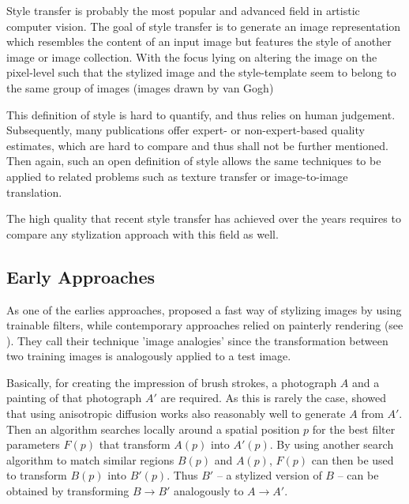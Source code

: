 Style transfer is probably the most popular and advanced field in artistic computer vision.
The goal of style transfer is to generate an image representation which resembles the content of an input image but features the style of another image or image collection.
With the focus lying on altering the image on the pixel-level such that the stylized image and the style-template seem to belong to the same group of images (\eg images drawn by van Gogh)

This definition of style is hard to quantify, and thus relies on human judgement.
Subsequently, many publications offer expert- or non-expert-based quality estimates, which are hard to compare and thus shall not be further mentioned.
Then again, such an open definition of style allows the same techniques to be applied to related problems such as texture transfer or image-to-image translation.

The high quality that recent style transfer has achieved over the years requires to compare any stylization approach with this field as well.

\subsection{Early Approaches}

As one of the earlies approaches, \citeauthor*{imageanalogies} proposed a fast way of stylizing images by using trainable filters, while contemporary approaches relied on painterly rendering (see ).
They call their technique 'image analogies' since the transformation between two training images is analogously applied to a test image.

Basically, for creating the impression of brush strokes, a photograph $A$ and a painting of that photograph $A'$ are required.
As this is rarely the case, \citeauthor*{iamgeanalogies} showed that using anisotropic diffusion works also reasonably well to generate $A$ from $A'$.
Then an algorithm searches locally around a spatial position $p$ for the best filter parameters $F(p)$ that transform $A(p)$ into $A'(p)$.
By using another search algorithm to match similar regions $B(p)$ and $A(p)$, $F(p)$ can then be used to transform $B(p)$ into $B'(p)$.
Thus $B'$ -- a stylized version of $B$ -- can be obtained by transforming $B \rightarrow B'$ analogously to $A \rightarrow A'$.

